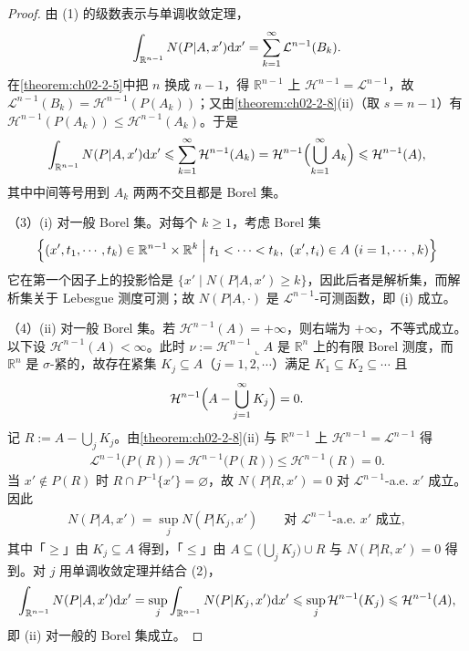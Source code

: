 \documentclass[../../main.tex]{subfiles}%
\begin{document}
\begin{proof}
由 (1) 的级数表示与单调收敛定理，
\begin{align*}
\int_{\mathbb{R}^{n-1}}N(P|A,x')\mathrm{d} x'=\sum_{k=1}^{\infty}\mathcal{L}^{n-1}(B_k).
\end{align*}
在\cref{theorem:ch02-2-5}中把 $n$ 换成 $n-1$，得 $\mathbb{R}^{n-1}$ 上 $\mathcal{H}^{n-1}=\mathcal{L}^{n-1}$，故 $\mathcal{L}^{n-1}(B_k)=\mathcal{H}^{n-1}(P(A_k))$；又由\cref{theorem:ch02-2-8}(ii)（取 $s=n-1$）有 $\mathcal{H}^{n-1}(P(A_k))\leqslant\mathcal{H}^{n-1}(A_k)$。于是%
\begin{align*}
\int_{\mathbb{R}^{n-1}}N(P|A,x')\mathrm{d} x'\leqslant\sum_{k=1}^{\infty}\mathcal{H}^{n-1}(A_k)=\mathcal{H}^{n-1}\Bigl(\bigcup_{k=1}^{\infty}A_k\Bigr)\leqslant\mathcal{H}^{n-1}(A),
\end{align*}
其中中间等号用到 $A_k$ 两两不交且都是 Borel 集。

（3）(i) 对一般 Borel 集。对每个 $k\geqslant1$，考虑 Borel 集
\begin{align*}
\Bigl\{(x',t_1,\cdots,t_k)\in\mathbb{R}^{n-1}\times\mathbb{R}^k\Bigm|t_1<\cdots<t_k,\ (x',t_i)\in A\ (i=1,\cdots,k)\Bigr\}
\end{align*}
它在第一个因子上的投影恰是 $\{x'\mid N(P|A,x')\geqslant k\}$，因此后者是解析集，而解析集关于 Lebesgue 测度可测；故 $N(P|A,\cdot)$ 是 $\mathcal{L}^{n-1}$-可测函数，即 (i) 成立。

（4）(ii) 对一般 Borel 集。若 $\mathcal{H}^{n-1}(A)=+\infty$，则右端为 $+\infty$，不等式成立。以下设 $\mathcal{H}^{n-1}(A)<\infty$。此时 $\nu:=\mathcal{H}^{n-1}\llcorner A$ 是 $\mathbb{R}^n$ 上的有限 Borel 测度，而 $\mathbb{R}^n$ 是 $\sigma$-紧的，故存在紧集 $K_j\subseteq A$（$j=1,2,\cdots$）满足 $K_1\subseteq K_2\subseteq\cdots$ 且
\begin{align*}
\mathcal{H}^{n-1}\Bigl(A-\bigcup_{j=1}^{\infty}K_j\Bigr)=0 .
\end{align*}
记 $R:=A-\bigcup_jK_j$。由\cref{theorem:ch02-2-8}(ii) 与 $\mathbb{R}^{n-1}$ 上 $\mathcal{H}^{n-1}=\mathcal{L}^{n-1}$ 得%
\begin{align*}
\mathcal{L}^{n-1}\bigl(P(R)\bigr)=\mathcal{H}^{n-1}\bigl(P(R)\bigr)\leqslant\mathcal{H}^{n-1}(R)=0 .
\end{align*}
当 $x'\notin P(R)$ 时 $R\cap P^{-1}\{x'\}=\varnothing$，故 $N(P|R,x')=0$ 对 $\mathcal{L}^{n-1}$-a.e. $x'$ 成立。因此
\begin{align*}
N(P|A,x')=\sup_{j}N(P|K_j,x')\qquad\text{对 }\mathcal{L}^{n-1}\text{-a.e. }x'\text{ 成立},
\end{align*}
其中「$\geqslant$」由 $K_j\subseteq A$ 得到，「$\leqslant$」由 $A\subseteq\bigl(\bigcup_jK_j\bigr)\cup R$ 与 $N(P|R,x')=0$ 得到。对 $j$ 用单调收敛定理并结合 (2)，
\begin{align*}
\int_{\mathbb{R}^{n-1}}N(P|A,x')\mathrm{d} x'=\sup_{j}\int_{\mathbb{R}^{n-1}}N(P|K_j,x')\mathrm{d} x'\leqslant\sup_{j}\mathcal{H}^{n-1}(K_j)\leqslant\mathcal{H}^{n-1}(A),
\end{align*}
即 (ii) 对一般的 Borel 集成立。
\end{proof}
\end{document}
